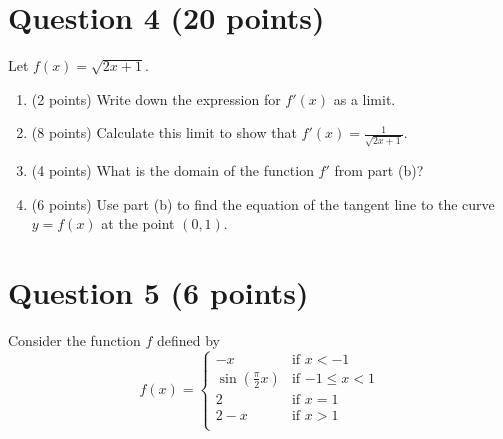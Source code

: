 \documentclass{article}
\begin{document}
\pagebreak

\section*{Question 4 (20 points)}
Let $\displaystyle f(x) =\sqrt{2x+1}$.

    \begin{enumerate}[label=(\alph*)]
    \item (2 points) Write down the expression for $f'(x)$ as a limit.
    \vspace{0.5in}
    \item (8 points) Calculate this limit to show that $f'(x)=\frac{1}{\sqrt{2x+1}}$.
    \vspace{4in}
    \item (4 points) What is the domain of the function $f'$ from part (b)?
    \vspace{0.5in}
    \item (6 points) Use part (b) to find the equation of the tangent line to the curve $y=f(x)$ at the point $(0,1)$.

    \end{enumerate}

\pagebreak

\section*{Question 5 (6 points)}
Consider the function $f$ defined by
\begin{displaymath}
f(x) = \left\{ \begin{array}{ll}
-x & \textrm{if $x<-1$}\\
\sin{\left(\frac{\pi}{2}x\right)} & \textrm{if $-1 \leq x <1 $}\\
2 & \textrm{if $x=1$}\\
2-x & \textrm{if $x>1$}\\
\end{array} \right.
\end{displaymath}
\end{document}
